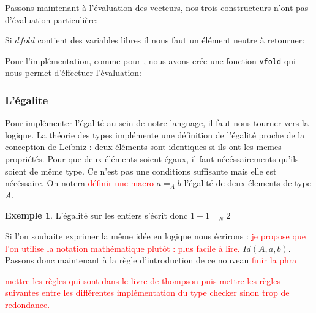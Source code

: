 \documentclass {article}
\newcommand{\codefrom}[3]
           {}
\theoremstyle{definition}
\newtheorem{example}{Exemple}
\theoremstyle{remark}
\newcommand{\todo}[1]{\textcolor{red}{#1}}
\newcommand{\fun}[1]{\lstinline!#1!}
\begin{document}
Passons maintenant à l'évaluation des vecteurs, nos trois constructeurs 
n'ont pas d'évaluation particulière:
\codefrom{dependent}{lambda}{big_step_vec}

Si $dfold$ contient des variables libres il nous faut un élément neutre à retourner:
%
\codefrom{dependent}{lambda}{neutral_fold}

Pour l'implémentation, comme pour \iter, nous avons crée une fonction \fun{vfold}
qui nous permet d'éffectuer l'évaluation:

\codefrom{dependent}{lambda}{vfold}


\subsubsection{L'égalite} 

Pour implémenter l'égalité au sein de notre language, il faut nous tourner vers la logique. 
La théorie des types implémente une définition de l'égalité proche de la conception de Leibniz : deux éléments sont identiques si ils ont les memes propriétés.
Pour que deux éléments soient égaux, il faut nécéssairements qu'ils soient de même type. Ce n'est pas une
conditions suffisante mais elle est nécéssaire. On notera \todo{définir une macro}  $a =_A b$ l'égalité de deux élements de type $A$.
\begin{example}
  L'égalité sur les entiers s'écrit donc $1 + 1 =_{N} 2$
\end{example}

Si l'on souhaite exprimer la même idée en logique nous écrirons : \todo{je propose que l'on utilise la notation mathématique plutôt : plus facile à lire.}  $Id(A,a,b)$.
Passons donc maintenant à la règle d'introduction de ce nouveau \todo{finir la phra}

\todo{mettre les règles qui sont dans le livre de thompson puis mettre les règles suivantes entre les différentes
  implémentation du type checker sinon trop de redondance.}
\end{document}
